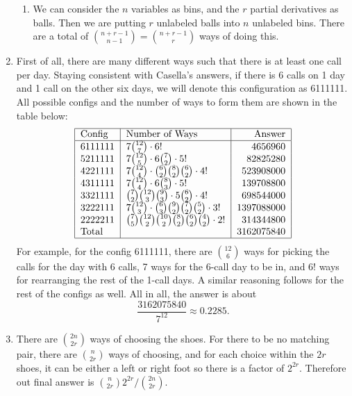 \documentclass{article}
\begin{document}
\begin{enumerate}
\begin{enumerate}
        \item We can consider the $n$ variables as bins, and the $r$ partial derivatives as 
        balls. Then we are putting $r$ unlabeled balls into $n$ unlabeled bins. There are a 
        total of $\binom{n + r - 1}{n - 1} = \binom{n + r - 1}{r}$ ways of doing this.    
    \end{enumerate}

    \item First of all, there are many different ways such that there is at least one call per day. Staying consistent with Casella's answers, if there is 6 calls on 1 day and 1 call on 
    the other six days, we will denote this configuration as 6111111. All possible configs and 
    the number of ways to form them are shown in the table below:
    \[ \begin{tabular}{|l|l|r|}
        \hline
        \text{Config} & \text{Number of Ways} & \text{Answer} \\ 
        \hline
        6111111 & $7\binom{12}{7} \cdot 6!$ & 4656960 \\
        5211111 & $7\binom{12}{5} \cdot 6\binom{7}{2} \cdot 5! $ & 82825280 \\
        4221111 & $7\binom{12}{4} \cdot \binom{6}{2}\binom{8}{2}\binom{6}{2} \cdot 4!$ 
        & 523908000 \\
        4311111 & $7\binom{12}{4} \cdot 6\binom{8}{3} \cdot 5! $ & 139708800 \\
        3321111 & $\binom{7}{2}\binom{12}{3}\binom{9}{3} \cdot 5\binom{6}{2} \cdot 4!$ 
        & 698544000 \\
        3222111 & $7\binom{12}{3} \cdot \binom{6}{3}\binom{9}{2}\binom{7}{2}\binom{5}{2} \cdot 3!$ 
        & 1397088000 \\
        2222211 & $\binom{7}{5}\binom{12}{2}\binom{10}{2}\binom{8}{2}\binom{6}{2}\binom{4}{2}
        \cdot 2!$ & 314344800 \\
        Total & & 3162075840 \\
        \hline
    \end{tabular} \]
    For example, for the config 6111111, there are $\binom{12}{6}$ ways for picking the calls 
    for the day with 6 calls, 7 ways for the 6-call day to be in, and $6!$ ways for rearranging 
    the rest of the 1-call days. A similar reasoning follows for the rest of the configs as well.
    All in all, the answer is about
    \[ \frac{3162075840}{7^{12}} \approx 0.2285. \]

    \item There are $\binom{2n}{2r}$ ways of choosing the shoes. For there to be no matching pair, 
    there are $\binom{n}{2r}$ ways of choosing, and for each choice within the $2r$ shoes, it can 
    be either a left or right foot so there is a factor of $2^{2r}$. Therefore out final answer is 
    $\binom{n}{2r}2^{2r} / \binom{2n}{2r}$.


\end{enumerate}
\end{document}
